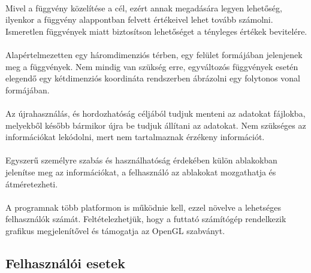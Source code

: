 \documentclass[12pt]{report}
\begin{document}
\paragraph{}
Mivel a függvény közelítése a cél, ezért annak megadására legyen lehetőség, ilyenkor a függvény alappontban felvett értékeivel lehet tovább számolni. Ismeretlen függvények miatt biztosítson lehetőséget a tényleges értékek bevitelére.
\paragraph{}
Alapértelmezetten egy háromdimenziós térben, egy felület formájában jelenjenek meg a függvények. Nem mindig van szükség erre, egyváltozós függvények esetén elegendő egy kétdimenziós koordináta rendszerben ábrázolni egy folytonos vonal formájában.
\paragraph{}
Az újrahasználás, és hordozhatóság céljából tudjuk menteni az adatokat fájlokba, melyekből később bármikor újra be tudjuk állítani az adatokat. Nem szükséges az információkat lekódolni, mert nem tartalmaznak érzékeny információt.
\paragraph{}
Egyszerű személyre szabás és használhatóság érdekében külön ablakokban jelenítse meg az információkat, a felhasználó az ablakokat mozgathatja és átméretezheti.
\paragraph{}
A programnak több platformon is működnie kell, ezzel növelve a lehetséges felhasználók számát. Feltételezhetjük, hogy a futtató számítógép rendelkezik grafikus megjelenítővel és támogatja az OpenGL szabványt.

\subsection{Felhasználói esetek}
\end{document}
